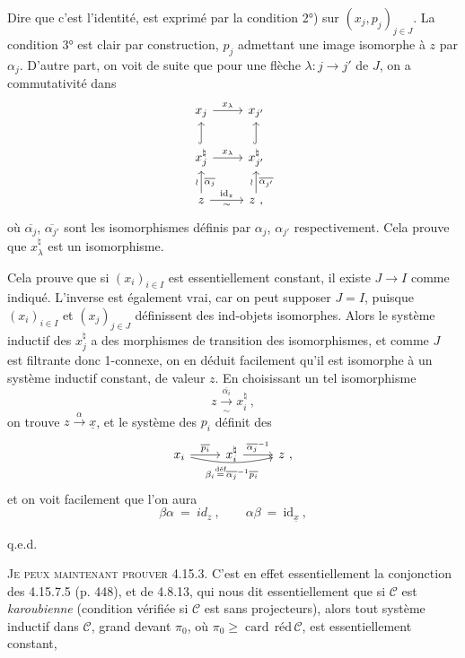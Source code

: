 \documentclass[11pt]{article}
\newcommand{\printedpage}[1]{\marginpar{\footnotesize p.~#1}}
\newcommand{\msp}[1]{\marginpar{\footnotesize [#1]}}
\newcommand{\card}{\operatorname{card}}
\begin{document}
\printedpage{174}

\msp{page 451}
Dire que c'est l'identité, est exprimé par la condition 2°) sur $(x_j,p_j)_{j\in J}$. La condition 3° est clair par construction, $p_j$ admettant une image isomorphe à $z$ par $\alpha_j$. D'autre part, on voit de suite que pour une flèche $\lambda : j \longrightarrow j'$ de $J$, on a commutativité dans %
\[
\begin{tikzcd}
x_j \arrow[r, "x_\lambda"] & x_{j'} \\
x_j^\natural \arrow[u, hook] \arrow[r, "x_\lambda"] & x_{j'}^\natural \arrow[u, hook] \\
z \arrow[u, "\wr", "\overline{\alpha_j}"'] \arrow[r, "\mathrm{id}_z", "\sim"'] & z \ , \arrow[u, "\wr", "\overline{\alpha_{j'}}"']
\end{tikzcd}
\]
où $\overline{\alpha_j}$, $\overline{\alpha_{j'}}$ sont les isomorphismes définis par $\alpha_j$, $\alpha_{j'}$ respectivement. Cela prouve que $x_\lambda^\natural$ est un isomorphisme.

Cela prouve que si $(x_i)_{i\in I}$ est essentiellement constant, il existe $J\longrightarrow I$ comme indiqué. L'inverse est également vrai, car on peut supposer $J = I$, puisque $(x_i)_{i\in I}$ et $(x_j)_{j\in J}$ définissent des ind-objets isomorphes. Alors le système inductif des $x_j^\natural$ a des morphismes de transition des isomorphismes, et comme $J$ est filtrante donc 1-connexe, on en déduit facilement qu'il est isomorphe
\msp{page 452}
à un système inductif constant, de valeur $z$. En choisissant un tel isomorphisme
\[
z \xrightarrow[\sim]{\overline{\alpha_i}} x_i^\natural \ ,
\]
on trouve $z \xrightarrow{\alpha} \underline{x}$, et le système des $p_i$ définit des
\[
\begin{tikzcd}
x_i \arrow[r, "\overline{p_i}"] \arrow[rr, bend right=12, "\beta_i \overset{\text{déf}}{=} \overline{\alpha_j}^{-1}\overline{p_i}"'] & x_i^\natural \arrow[r, "\overline{\alpha_j}^{-1}"] & z \ ,
\end{tikzcd}
\] %
et on voit facilement que l'on aura
\[
\beta\alpha \ = \ id_z \ , \qquad \alpha\beta \ = \ \mathrm{id}_{\underline{x}} \ ,
\]

\hfill q.e.d.

\textsc{Je peux maintenant prouver} 4.15.3. C'est en effet essentiellement la conjonction des 4.15.7.5 (p. 448), et de 4.8.13, qui nous dit essentiellement que si $\mathcal{C}$ est \textit{karoubienne} (condition vérifiée si $\mathcal{C}$ est sans projecteurs), alors tout système inductif dans $\mathcal{C}$, grand devant $\pi_0$, où $\pi_0 \geqslant \card\,\text{réd}\,\mathcal{C}$, est essentiellement constant,
\end{document}
